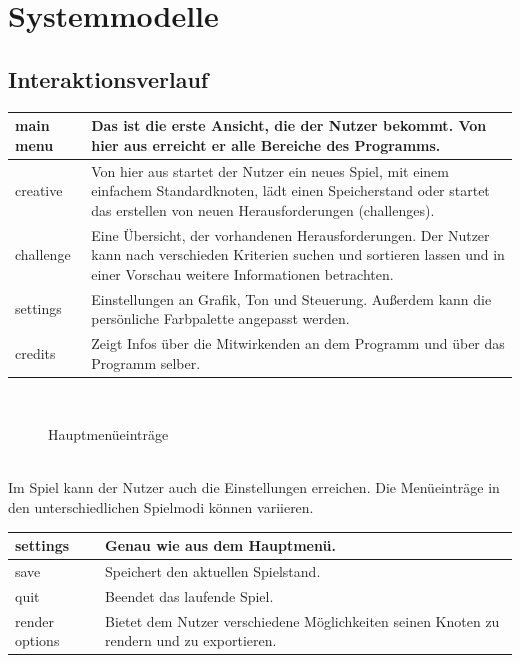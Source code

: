\chapter{Systemmodelle}


\section{Interaktionsverlauf}

	\begin{longtable}{|p{}|p{}|}
    \hline
    main menu & Das ist die erste Ansicht, die der Nutzer bekommt. Von hier aus erreicht er alle Bereiche des Programms.\\
    \hline
    creative & Von hier aus startet der Nutzer ein neues Spiel, mit einem einfachem Standardknoten, lädt einen Speicherstand oder startet das erstellen von neuen Herausforderungen (challenges).\\
    \hline
    challenge & Eine Übersicht, der vorhandenen Herausforderungen. Der Nutzer kann nach verschieden Kriterien suchen und sortieren lassen und in einer Vorschau weitere Informationen betrachten.\\
    \hline
    settings & Einstellungen an Grafik, Ton und Steuerung. Außerdem kann die persönliche Farbpalette angepasst werden.\\
    \hline
    credits & Zeigt Infos über die Mitwirkenden an dem Programm und über das Programm selber.\\
    \hline
    
   \end{longtable}
   
   ~\\
    
	\begin{figure}[h]
		\centering
	 	
	 	\caption{Hauptmenüeinträge}
	\end{figure}
	
	\clearpage
	~\\
	
	Im Spiel kann der Nutzer auch die {\color{red} Einstellungen} erreichen. Die Menüeinträge in den unterschiedlichen Spielmodi können variieren.
		
	\begin{longtable}{|p{}|p{}|}
	
	\hline
	settings & Genau wie aus dem Hauptmenü.\\
	\hline
	save & Speichert den aktuellen Spielstand.\\
	\hline
	quit & Beendet das laufende Spiel. \\
	\hline
	render options & Bietet dem Nutzer verschiedene Möglichkeiten seinen Knoten zu rendern und zu exportieren.\\
	\hline
	
	\end{longtable}
	
